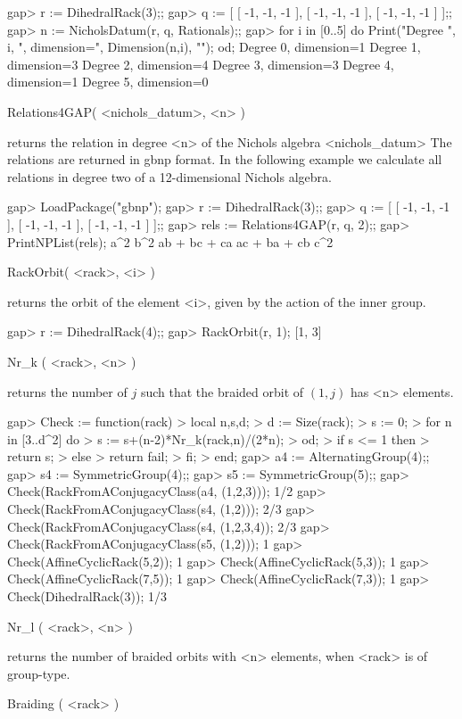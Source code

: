 \beginexample
gap> r := DihedralRack(3);;
gap> q := [ [ -1, -1, -1 ], [ -1, -1, -1 ], [ -1, -1, -1 ] ];;
gap> n := NicholsDatum(r, q, Rationals);;
gap> for i in [0..5] do
Print("Degree ", i, ", dimension=", Dimension(n,i), "\n");
od;
Degree 0, dimension=1
Degree 1, dimension=3
Degree 2, dimension=4
Degree 3, dimension=3
Degree 4, dimension=1
Degree 5, dimension=0
\endexample

\> Relations4GAP( <nichols_datum>, <n> )

returns the relation in degree <n> of the Nichols algebra <nichols_datum> The
relations are returned in gbnp format.  In the following example we calculate
all relations in degree two of a 12-dimensional Nichols algebra.

\beginexample
gap> LoadPackage("gbnp");
gap> r := DihedralRack(3);;
gap> q := [ [ -1, -1, -1 ], [ -1, -1, -1 ], [ -1, -1, -1 ] ];;
gap> rels := Relations4GAP(r, q, 2);;
gap> PrintNPList(rels);
 a^2 
 b^2 
 ab + bc + ca 
 ac + ba + cb 
 c^2 
\endexample

\> RackOrbit( <rack>, <i> )

returns the orbit of the element <i>, given by the action of the inner group.

\beginexample
gap> r := DihedralRack(4);;
gap> RackOrbit(r, 1);
[1, 3]
\endexample

\>Nr_k ( <rack>, <n> )

returns the number of $j$ such that the braided orbit of $(1,j)$ 
has <n> elements.

\beginexample
gap> Check := function(rack)
> local n,s,d;
> d := Size(rack);
> s := 0;
> for n in [3..d^2] do
>   s := s+(n-2)*Nr_k(rack,n)/(2*n);
> od;
> if s <= 1 then
>   return s;
> else
>   return fail;
> fi;
> end;
gap> a4 := AlternatingGroup(4);;
gap> s4 := SymmetricGroup(4);;
gap> s5 := SymmetricGroup(5);;
gap> Check(RackFromAConjugacyClass(a4, (1,2,3)));
1/2
gap> Check(RackFromAConjugacyClass(s4, (1,2)));    
2/3
gap> Check(RackFromAConjugacyClass(s4, (1,2,3,4));
2/3
gap> Check(RackFromAConjugacyClass(s5, (1,2)));    
1
gap> Check(AffineCyclicRack(5,2));                            
1
gap> Check(AffineCyclicRack(5,3));
1
gap> Check(AffineCyclicRack(7,5));  
1
gap> Check(AffineCyclicRack(7,3));
1
gap> Check(DihedralRack(3));      
1/3
\endexample

\>Nr_l ( <rack>, <n> )

returns the number of braided orbits with <n> elements, when <rack> is of
group-type.

\>Braiding ( <rack> )

